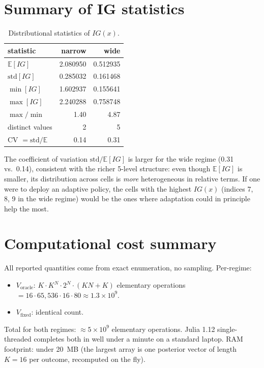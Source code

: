 \documentclass[11pt,a4paper]{article}
\newcommand{\E}{\mathbb{E}}
\begin{document}
\section{Summary of IG statistics}

\begin{table}[h!]
\centering
\begin{tabular}{@{}lrr@{}}
\toprule
statistic & narrow & wide \\
\midrule
$\E[IG]$         & 2.080950 & 0.512935 \\
$\mathrm{std}[IG]$ & 0.285032 & 0.161468 \\
$\min[IG]$       & 1.602937 & 0.155641 \\
$\max[IG]$       & 2.240288 & 0.758748 \\
$\max/\min$      & 1.40     & 4.87     \\
distinct values  & 2        & 5        \\
CV $=\mathrm{std}/\E$ & 0.14 & 0.31 \\
\bottomrule
\end{tabular}
\caption{Distributional statistics of $IG(x)$.}
\label{tab:IG_stats}
\end{table}

The coefficient of variation $\mathrm{std}/\E[IG]$ is larger for the wide regime (0.31 vs.\ 0.14), consistent with the richer 5-level structure: even though $\E[IG]$ is smaller, its distribution across cells is \emph{more} heterogeneous in relative terms.  If one were to deploy an adaptive policy, the cells with the highest $IG(x)$ (indices 7, 8, 9 in the wide regime) would be the ones where adaptation could in principle help the most.

\section{Computational cost summary}

All reported quantities come from exact enumeration, no sampling.  Per-regime:
\begin{itemize}[nosep]
  \item $V_{\text{oracle}}$: $K \cdot K^N \cdot 2^N \cdot (KN + K)$ elementary operations $= 16 \cdot 65{,}536 \cdot 16 \cdot 80 \approx 1.3 \times 10^9$.
  \item $V_{\text{fixed}}$: identical count.
\end{itemize}
Total for both regimes: $\approx 5 \times 10^9$ elementary operations.  Julia 1.12 single-threaded completes both in well under a minute on a standard laptop.  RAM footprint: under 20~MB (the largest array is one posterior vector of length $K = 16$ per outcome, recomputed on the fly).
\end{document}
